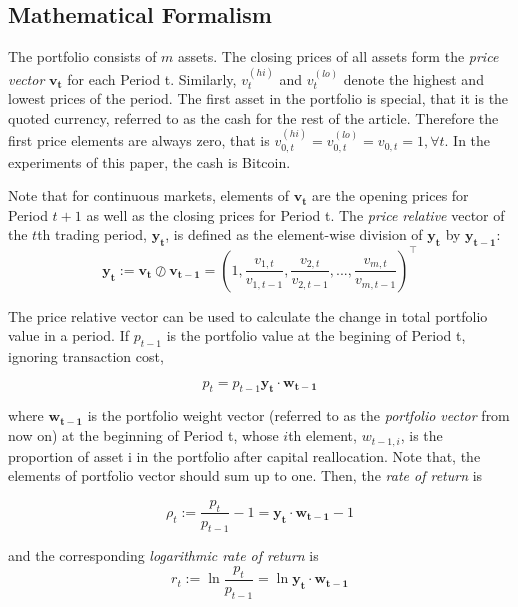\documentclass[journal,onecolumn]{IEEEtran}
\newcommand{\vc}[1]{\mathbf{#1}}
\begin{document}
\subsection{Mathematical Formalism}
The portfolio consists of $m$ assets. The closing prices of all assets form the \textit{price vector} $\vc{v_t}$ for each Period t. Similarly, $v^{(hi)}_t$ and $v^{(lo)}_t$ denote the highest and lowest prices of the period. The first asset in the portfolio is special, that it is the quoted currency, referred to
as the cash for the rest of the article. Therefore the first price elements are always zero, that is $v^{(hi)}_{0,t} = v^{(lo)}_{0,t} = v_{0,t} = 1, \forall t$. In the experiments of this paper, the cash is Bitcoin.

Note that for continuous markets, elements of $\vc{v_t}$ are the opening prices for Period $t + 1$ as well as the closing prices for Period t. The \textit{price relative} vector of the $t$th trading period, $\vc{y_t}$, is defined as the element-wise division of $\vc{y_t}$ by $\vc{y_{t-1}}$:
\begin{equation}
	\vc{y_t}:=\vc{v_t}\oslash\vc{v_{t-1}} = (1, \frac{v_{1,t}}{v_{1,t-1}}, \frac{v_{2,t}}{v_{2,t-1}}, ..., \frac{v_{m,t}}{v_{m,t-1}})^\top
\end{equation}

The price relative vector can be used to calculate the change in total
portfolio value in a period. If $p_{t-1}$ is the portfolio value at the begining of Period t, ignoring transaction cost,

\begin{equation}
	p_t = p_{t-1}\vc{y_t}\cdot\vc{w_{t-1}}
\end{equation}

where $\vc{w_{t-1}}$ is the portfolio weight vector (referred to as the \textit{portfolio vector} from now on) at the beginning of Period t, whose $i$th element, $w_{t-1,i}$, is the proportion of asset i in the portfolio after capital reallocation. Note that, the elements of portfolio vector should sum up to one. Then, the \textit{rate of return} is

\begin{equation}
	\rho_t := \frac{p_t}{p_{t-1}} - 1 = \vc{y_t}\cdot\vc{w_{t-1}} - 1
\end{equation}

and the corresponding \textit{logarithmic rate of return} is
\begin{equation}
r_t := \ln \frac{p_t}{p_{t-1}} = \ln \vc{y_t}\cdot\vc{w_{t-1}}
\end{equation}
\end{document}
